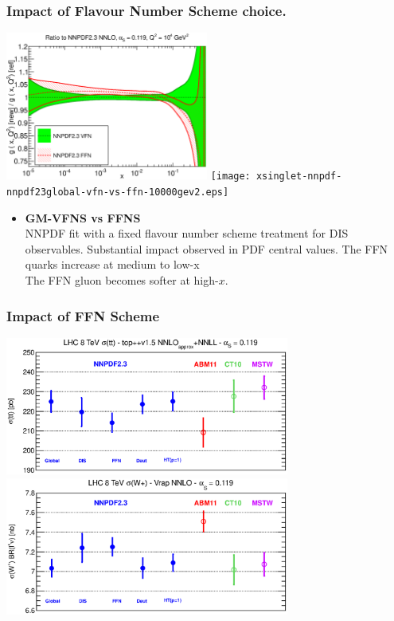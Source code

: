 \documentclass[10pt]{beamer}
\begin{document}
\begin{frame}
\frametitle{Impact of Flavour Number Scheme choice.}

\includegraphics[width=0.5\textwidth]{xg-nnpdf-nnpdf23global-vfn-vs-ffn-10000gev2.eps}
\texttt{[image: xsinglet-nnpdf-nnpdf23global-vfn-vs-ffn-10000gev2.eps]}

\vskip10pt

\begin{itemize}
\item<1-> \textbf{GM-VFNS vs FFNS}\\
\small		NNPDF fit with a fixed flavour number scheme treatment for DIS observables. Substantial impact observed in PDF central values.
\vskip5pt
The FFN quarks increase at medium to low-x\\
The FFN gluon becomes softer at high-$x$.
\vskip5pt
\end{itemize}

\end{frame}

\begin{frame}
\frametitle{Impact of FFN Scheme}
\begin{center}
\includegraphics[width=0.7\textwidth]{tt8.eps}\\
\includegraphics[width=0.7\textwidth]{wp8.eps}
\end{center}
\end{frame}
\end{document}
